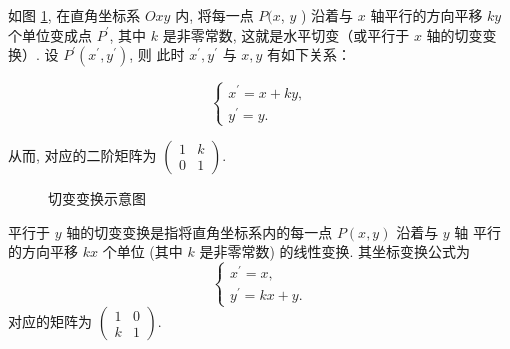\documentclass[lang=cn,newtx,10pt,scheme=chinese]{elegantbook}
\begin{document}
如图 \ref{fig:切变变换}, 在直角坐标系 $O x y$ 内, 将每一点 $P(x$, $y$ ) 沿着与 $x$ 轴平行的方向平移 $k y$ 个单位变成点 $P^{\prime}$, 其中 $k$ 是非零常数, 这就是水平切变（或平行于 $x$ 轴的切变变换）.
设 $P^{\prime}\left(x^{\prime}, y^{\prime}\right)$, 则
此时 $x^{\prime}, y^{\prime}$ 与 $x, y$ 有如下关系：

$$
\left\{\begin{array}{c}
x^{\prime}=x+k y, \\
y^{\prime}=y .
\end{array}\right.
$$

从而, 对应的二阶矩阵为 $\left(\begin{array}{ll}1 & k \\ 0 & 1\end{array}\right)$.

\begin{figure}[h]
\centering
{}
\caption{切变变换示意图\label{fig:切变变换}}
\end{figure}

\begin{exercise}

    平行于 $y$ 轴的切变变换是指将直角坐标系内的每一点 $P(x, y)$ 沿着与 $y$ 轴 平行的方向平移 $k x$ 个单位 (其中 $k$ 是非零常数) 的线性变换. 其坐标变换公式为
    $$
    \left\{\begin{array}{c}
    x^{\prime}=x, \\
    y^{\prime}=k x+y .
    \end{array}\right.
    $$
    对应的矩阵为 $\left(\begin{array}{ll}1 & 0 \\ k & 1\end{array}\right)$.
        
\end{exercise}
\end{document}

